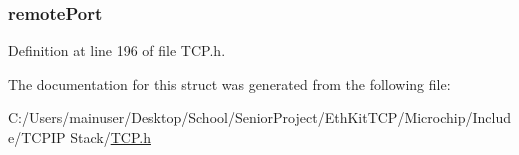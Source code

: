 \hypertarget{struct_s_o_c_k_e_t___i_n_f_o_aa316e3d5bcdbc999280ce3bb80ef116e}{}
\subsubsection[{remote\+Port}]{ remote\+Port}\label{struct_s_o_c_k_e_t___i_n_f_o_aa316e3d5bcdbc999280ce3bb80ef116e}


Definition at line 196 of file T\+C\+P.\+h.



The documentation for this struct was generated from the following file\+:\begin{DoxyCompactItemize}
\item 
C\+:/\+Users/mainuser/\+Desktop/\+School/\+Senior\+Project/\+Eth\+Kit\+T\+C\+P/\+Microchip/\+Include/\+T\+C\+P\+I\+P Stack/\hyperlink{_t_c_p_8h}{T\+C\+P.\+h}\end{DoxyCompactItemize}
